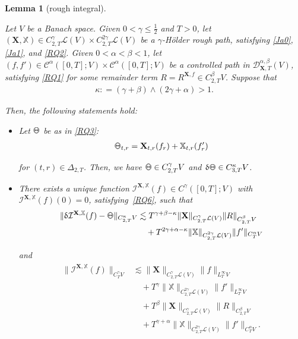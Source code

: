 \documentclass[letterpaper, 11pt,  reqno]{amsart}
\newtheorem{lemma}[theorem]{Lemma}
\newcommand{\1}{\hspace{0.5mm}\textup{I}\hspace{0.5mm}}
\newcommand{\I}{\mathcal{I}}
\newcommand{\noi}{\noindent}
\newcommand{\CC}{\mathcal{C}}
\newcommand{\D}{\mathcal{D}}
\renewcommand{\L}{\mathcal{L}}
\newcommand{\al}{\alpha}
\newcommand{\be}{\beta}
\newcommand{\updl}{\updelta}
\newcommand{\Dl}{\Delta}
\newcommand{\kk}{\kappa}
\newcommand{\g}{\gamma}
\newcommand{\les}{\lesssim}
\newcommand{\XXb}{\mathbb{X}}
\newcommand{\XX}{\mathbf{X}}
\def\doublestroke#1{\pdfliteral{1 Tr .35 w}#1\pdfliteral{0 Tr 0 w}}
\newcommand{\Taa}{\doublestroke{\Theta}}
\numberwithin{equation}{section}
\numberwithin{theorem}{section}
\begin{document}
\begin{lemma}
[rough integral]
\label{LEM:int2}




Let $V$ be a Banach space.
Given $0 < \g \le \frac 12 $
and  $T>0$, 
let $(\XX, \XXb) 
\in C^\g_{2,T}\L(V)\times  C^{2\g}_{2,T}\L(V)$
be a $\g$-H\"older rough path,   
satisfying \eqref{Ja0}, 
\eqref{Ja1}, and \eqref{RQ2}.
Given $0 < \al < \be < 1$, 
let $(f, f') 
\in \CC^{\al}([0,T];V)
\times 
\CC^{\al}([0,T];V)$
be a controlled  path
in 
$\D^{\al, \be}_{\XX, T}(V)$, 
satisfying
\eqref{RQ1}
for some remainder term
 $R = R^{\XX, f}
\in  C^{\be}_{2, T}V$.
Suppose that 
\begin{align}
\kk : = (\g + \be)\wedge (2\g + \al) > 1.
\label{RQQ2}
\end{align}

\noi
Then,  the following statements hold\textup{:}



\smallskip

\begin{itemize}

\item[(i)] 
Let $\Taa$ be as in \eqref{RQ3}\textup{:}
\begin{align}
\Taa_{t,r}  = \XX_{t,r}(f_r) + \XXb_{t,r} (f'_r)
\label{RQQ1}
\end{align}


\noi
for $(t,r) \in \Dl_{2,T}$.
Then, 
we have $\Taa\in C^\g_{2,T}V$
and
$\updl \Taa \in C^\kk_{3,T}V$.









\smallskip

\item[(ii)]
There exists 
a unique function 
$\I^{\XX, \XXb}(f) \in C^\g([0,T]; V)$
with  $\I^{\XX, \XXb}(f)(0) =0$, satisfying~\eqref{RQ6}, 
such that
\begin{align}
\begin{split}
 \|  \updl \I^{\XX, \XXb}(f) - \Taa\|_{C^\kk_{2,T}  V}
& \les
 T^{\g+ \be -\kk}
\|\XX\|_{C^\g_{2,T}\L(V)}
\| R\|_{C^\be_{2,T}V}\\
& \quad + 
 T^{2\g+ \al-\kk}
\|\XXb\|_{C^{2\g}_{2,T}\L(V)}
\| f'\|_{C^\al_{T}V} 
\end{split}
\label{RQQ3}
\end{align}


\noi
and
\begin{align}
\begin{split}
\|\I^{\XX, \XXb}(f)\|_{C^\g_T  V} 
& \les
\|\XX\|_{C^\g_{2,T}\L(V)}
\|f \|_{L^\infty_TV}\\
& \quad 
+  T^{\g}
\|\XXb\|_{C^{2\g}_{2,T}\L(V)}
\|f' \|_{L^\infty_TV}\\
& \quad 
+  T^{\be}
\|\XX\|_{C^\g_{2,T}\L(V)}
\| R\|_{C^\be_{2,T}V}\\
& \quad + 
 T^{\g+ \al}
\|\XXb\|_{C^{2\g}_{2,T}\L(V)}
\| f'\|_{C^\al_{T}V}.
\end{split}
\label{RQQ4}
\end{align}



\end{itemize}
\end{lemma}
\end{document}
